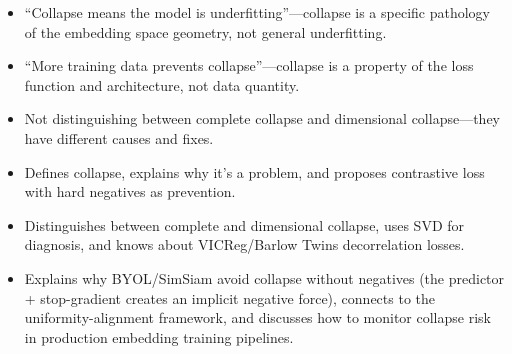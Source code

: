 \begin{interviewq}
\redflags
\begin{itemize}
    \item ``Collapse means the model is underfitting''---collapse is a specific pathology of the embedding space geometry, not general underfitting.
    \item ``More training data prevents collapse''---collapse is a property of the loss function and architecture, not data quantity.
    \item Not distinguishing between complete collapse and dimensional collapse---they have different causes and fixes.
\end{itemize}


\goodgreat
\begin{itemize}
    \item {} Defines collapse, explains why it's a problem, and proposes contrastive loss with hard negatives as prevention.
    \item {} Distinguishes between complete and dimensional collapse, uses SVD for diagnosis, and knows about VICReg/Barlow Twins decorrelation losses.
    \item {} Explains why BYOL/SimSiam avoid collapse without negatives (the predictor + stop-gradient creates an implicit negative force), connects to the uniformity-alignment framework, and discusses how to monitor collapse risk in production embedding training pipelines.
\end{itemize}

\end{interviewq}


